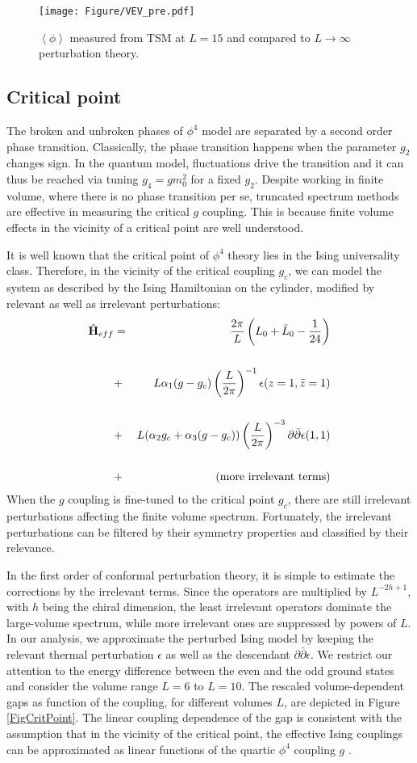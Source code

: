 \documentclass[twocolumn,secnumarabic,amssymb, nobibnotes, aps, prd]{revtex4-2}
\newcommand{\bea}{\begin{eqnarray}}
\newcommand{\eea}{\end{eqnarray}}
\begin{document}
\begin{figure}
\centering
\texttt{[image: Figure/VEV\_pre.pdf]}
\caption{$\left\langle\phi\right\rangle$ measured from TSM at $L=15$ and compared to $L\rightarrow\infty$ perturbation theory.}
\label{FigBrokenVEV}
\end{figure}

\subsection{Critical point}

The broken and unbroken phases of $\phi^4$ model are separated by a second order phase transition. Classically, the phase transition happens when the parameter $g_2$ changes sign. In the quantum model, fluctuations drive the transition and it can thus be reached via tuning $g_4=g m_0^2$ for a fixed $g_2$. Despite working in finite volume, where there is no phase transition per se, truncated spectrum methods are effective in measuring the critical $g$ coupling. This is because finite volume effects in the vicinity of a critical point are well understood.

It is well known that the critical point of $\phi^4$ theory lies in the Ising universality class. Therefore, in the vicinity of the critical coupling  $g_{c}$, we can model the system as described by the Ising Hamiltonian on the cylinder, modified by relevant as well as irrelevant perturbations:
\bea
\hat{\mathbf{H}}_{eff}&=&\frac{2\pi}{L}\left(L_0+\bar{L}_0-\frac{1}{24}\right)\cr\cr
&+&L\alpha_1(g-g_{c})\left(\frac{L}{2\pi}\right)^{-1}\epsilon(z=1,\bar{z}=1)\cr\cr
&+&L(\alpha_2 g_{c}+\alpha_3(g-g_{c}))\left(\frac{L}{2\pi}\right)^{-3}\partial\bar\partial\epsilon(1,1)\cr\cr
&+&(\text{more irrelevant terms})
\eea
When the $g$ coupling is fine-tuned to the critical point $g_{c}$, there are still irrelevant perturbations affecting the finite volume spectrum. Fortunately, the irrelevant perturbations can be filtered by their symmetry properties and classified by their relevance. 

In the first order of conformal perturbation theory, it is simple to estimate the corrections by the irrelevant terms. Since the operators are multiplied by $L^{-2h+1}$, with $h$ being the chiral dimension, the least irrelevant operators dominate the large-volume spectrum, while more irrelevant ones are suppressed by powers of $L$. In our analysis, we approximate the perturbed Ising model by keeping the relevant thermal perturbation $\epsilon$ as well as the descendant $\partial\bar\partial\epsilon$. We restrict our attention to the energy difference between the even and the odd ground states and consider the volume range $L=6$ to $L=10$. The rescaled volume-dependent gaps as function of the coupling, for different volumes $L$, are depicted in Figure \ref{FigCritPoint}. The linear coupling dependence of the gap is consistent with the assumption that in the vicinity of the critical point, the effective Ising couplings can be approximated as linear functions of the quartic  $\phi^4$ coupling $g$ .
\end{document}
